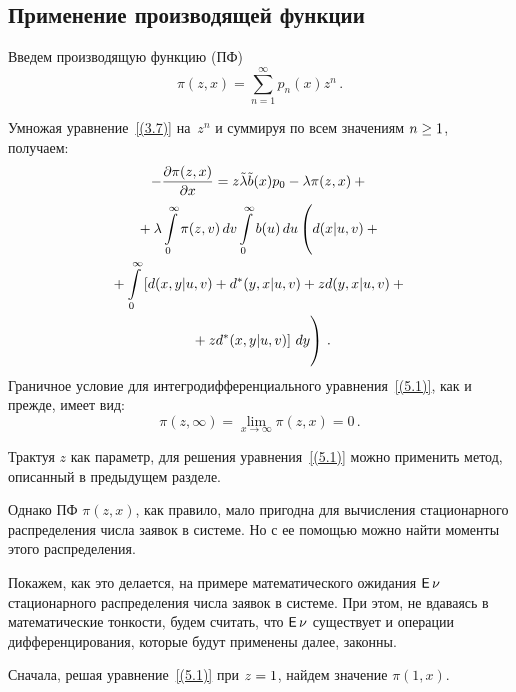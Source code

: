 \begin{multicols}{2}
\section{Применение производящей функции}

Введем производящую функцию (ПФ)
$$
\pi(z,x)= \sum\limits_{n=1}^\infty p_n(x)z^n\,.
$$

Умножая уравнение~\eqref{(3.7)} на~$z^n$
и суммируя по всем значениям $n\hm\ge1$, получаем:
\begin{multline}
\label{(5.1)}
-\displaystyle\frac{\displaystyle \partial \pi(z,x)\mathstrut}{\displaystyle \partial x\mathstrut}
= z \tilde\lambda \tilde b(x) p_0 - \lambda \pi(z,x)
+ {}\\
{}+\lambda \int\limits_0^\infty \pi(z,v)\,dv
\int\limits_0^\infty
b(u)\,du \left(\vphantom{\int\limits_0^\infty}
d(x|u,v) +{}\right.
\\
{}+ \int\limits_0^\infty
\left[d(x,y|u,v) + d^*(y,x|u,v)
+ z d(y,x|u,v) +{}\right.\\
\left.\left.{}+ z d^*(x,y|u,v)\right]
\,dy \vphantom{\int\limits_0^\infty}\right)\,.
\end{multline}
Граничное условие для интегродифференциального
уравнения~\eqref{(5.1)}, как и прежде, имеет вид:
\begin{equation*}
\pi(z,\infty) = \lim\limits_{x\to\infty} \pi(z,x)
= 0\,.
\end{equation*}

Трактуя $z$ как параметр, для решения
уравнения~\eqref{(5.1)} можно применить метод,
описанный в предыдущем разделе.


Однако ПФ $\pi(z,x)$, как правило, мало
пригодна для вычисления стационарного
распределения числа заявок в системе.
Но с ее помощью можно найти моменты этого
распределения.


Покажем, как это делается, на примере
математического ожидания ${\sf E}\,\nu$
стационарного распределения числа заявок в
системе.
При этом, не вдаваясь в математические тонкости,
будем считать, что ${\sf E}\,\nu$ существует и
операции дифференцирования, которые будут
применены далее, законны.



Сначала, решая уравнение~\eqref{(5.1)} при $z\hm=1$,
\mbox{найдем} значение $\pi(1,x)$.



\end{multicols}
